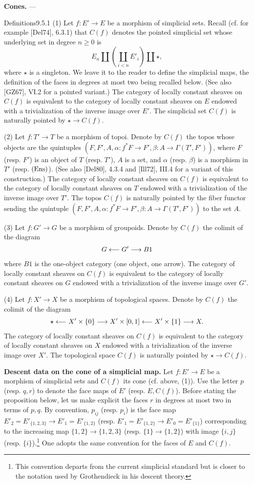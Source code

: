 \textbf{Cones.} ---
\begin{enoncerm}{Definitions}{9.5.1}\label{X.9.5.1}
(1) Let $f:E'\to E$ be a morphism of simplicial sets. Recall (cf. for example [Del74], 6.3.1) that $C(f)$ denotes the pointed simplicial set whose underlying set in degree $n\geq0$ is
\[
E_n\coprod\left(\coprod_{i<n}E'_i\right)\coprod\star,
\]
where $\star$ is a singleton. We leave it to the reader to define the simplicial maps, the definition of the faces in degrees at most two being recalled below. (See also [GZ67], VI.2 for a pointed variant.) The category of locally constant sheaves on $C(f)$ is equivalent to the category of locally constant sheaves on $E$ endowed with a trivialization of the inverse image over $E'$. The simplicial set $C(f)$ is naturally pointed by $\star\to C(f)$.

(2) Let $f:T'\to T$ be a morphism of topoi. Denote by $C(f)$ the topos whose objects are the quintuples $(F,F',A,\alpha:f^*F\to F',\beta:A\to\Gamma(T',F'))$, where $F$ (resp. $F'$) is an object of $T$ (resp. $T'$), $A$ is a set, and $\alpha$ (resp. $\beta$) is a morphism in $T'$ (resp. $\textup{(Ens)}$). (See also [Del80], 4.3.4 and [Ill72], III.4 for a variant of this construction.) The category of locally constant sheaves on $C(f)$ is equivalent to the category of locally constant sheaves on $T$ endowed with a trivialization of the inverse image over $T'$. The topos $C(f)$ is naturally pointed by the fiber functor sending the quintuple $(F,F',A,\alpha:f^*F\to F',\beta:A\to\Gamma(T',F'))$ to the set $A$.

(3) Let $f:G'\to G$ be a morphism of groupoids. Denote by $C(f)$ the colimit of the diagram
\[
G\longleftarrow G'\longrightarrow B1
\]
where $B1$ is the one-object category (one object, one arrow). The category of locally constant sheaves on $C(f)$ is equivalent to the category of locally constant sheaves on $G$ endowed with a trivialization of the inverse image over $G'$.

(4) Let $f:X'\to X$ be a morphism of topological spaces. Denote by $C(f)$ the colimit of the diagram
\[
\star\longleftarrow X'\times\{0\}\longrightarrow X'\times[0,1]\longleftarrow X'\times\{1\}\longrightarrow X.
\]
The category of locally constant sheaves on $C(f)$ is equivalent to the category of locally constant sheaves on $X$ endowed with a trivialization of the inverse image over $X'$. The topological space $C(f)$ is naturally pointed by $\star\to C(f)$.
\end{enoncerm}
\textbf{Descent data on the cone of a simplicial map.}
Let $f:E'\to E$ be a morphism of simplicial sets and $C(f)$ its cone (cf. above, (1)). Use the letter $p$ (resp. $q,r$) to denote the face maps of $E'$ (resp. $E,C(f)$). Before stating the proposition below, let us make explicit the faces $r$ in degrees at most two in terms of $p,q$. By convention, $p_{ij}$ (resp. $p_i$) is the face map $E'_2=E'_{\{1,2,3\}}\to E'_1=E'_{\{1,2\}}$ (resp. $E'_1=E'_{\{1,2\}}\to E'_0=E'_{\{1\}}$) corresponding to the increasing map $\{1,2\}\to\{1,2,3\}$ (resp. $\{1\}\to\{1,2\}$) with image $\{i,j\}$ (resp. $\{i\}$).\footnote{This convention departs from the current simplicial standard but is closer to the notation used by Grothendieck in his descent theory.} One adopts the same convention for the faces of $E$ and $C(f)$.
